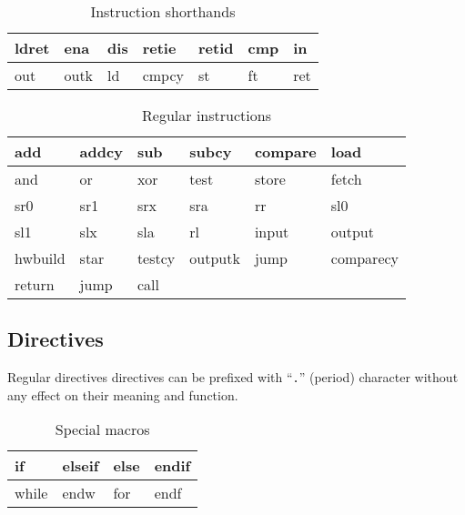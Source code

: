             \begin{table}[h!]
                \centering
                \begin{tabular}{|l|l|l|l|l|l|l|}
                    \hline
                    ldret & ena  & dis & retie & retid & cmp & in  \\\hline
                    out   & outk & ld  & cmpcy & st    & ft  & ret \\\hline
                \end{tabular}
                \caption{Instruction shorthands}
            \end{table}

            \begin{table}[h!]
                \centering
                \begin{tabular}{|l|l|l|l|l|l|}
                    \hline
                    add     & addcy & sub    & subcy   & compare & load      \\\hline
                    and     & or    & xor    & test    & store   & fetch     \\\hline
                    sr0     & sr1   & srx    & sra     & rr      & sl0       \\\hline
                    sl1     & slx   & sla    & rl      & input   & output    \\\hline
                    hwbuild & star  & testcy & outputk & jump    & comparecy \\\hline
                    return  & jump  & call   &         &         &           \\\hline
                \end{tabular}
                \caption{Regular instructions}
            \end{table}

        \subsection{Directives}
            Regular directives directives can be prefixed with ``\texttt{.}'' (period) character without any effect on their meaning and function.

            \begin{table}[h!]
                \centering
                \begin{tabular}{|l|l|l|l|}
                    \hline
                    if    & elseif  & else  & endif \\\hline
                    while & endw    & for   & endf  \\\hline
                \end{tabular}
                \caption{Special macros}
            \end{table}

